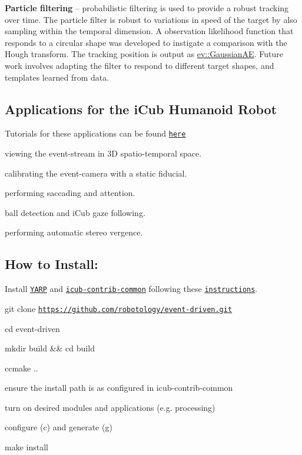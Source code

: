\begin{DoxyItemize}
\item {\bfseries Particle filtering} -- probabilistic filtering is used to provide a robust tracking over time. The particle filter is robust to variations in speed of the target by also sampling within the temporal dimension. A observation likelihood function that responds to a circular shape was developed to instigate a comparison with the Hough transform. The tracking position is output as {\ttfamily \hyperlink{classev_1_1GaussianAE}{ev\+::\+Gaussian\+AE}}. Future work involves adapting the filter to respond to different target shapes, and templates learned from data.
\end{DoxyItemize}

\subsection*{Applications for the i\+Cub Humanoid Robot}

Tutorials for these applications can be found \href{http://robotology.github.io/event-driven/doxygen/doc/html/pages.html}{\tt here}


\begin{DoxyItemize}
\item viewing the event-\/stream in 3D spatio-\/temporal space.
\item calibrating the event-\/camera with a static fiducial.
\item performing saccading and attention.
\item ball detection and i\+Cub gaze following.
\item performing automatic stereo vergence.
\end{DoxyItemize}

\subsection*{How to Install\+:}


\begin{DoxyEnumerate}
\item Install \href{https://github.com/robotology/yarp}{\tt Y\+A\+RP} and \href{https://github.com/robotology/icub-contrib-common}{\tt icub-\/contrib-\/common} following these \href{http://wiki.icub.org/wiki/Linux:Installation_from_sources}{\tt instructions}.
\item git clone \href{https://github.com/robotology/event-driven.git}{\tt https\+://github.\+com/robotology/event-\/driven.\+git}
\item cd event-\/driven
\item mkdir build \&\& cd build
\item ccmake ..
\item ensure the install path is as configured in icub-\/contrib-\/common
\item turn on desired modules and applications (e.\+g. processing)
\item configure (c) and generate (g)
\item make install
\end{DoxyEnumerate}

